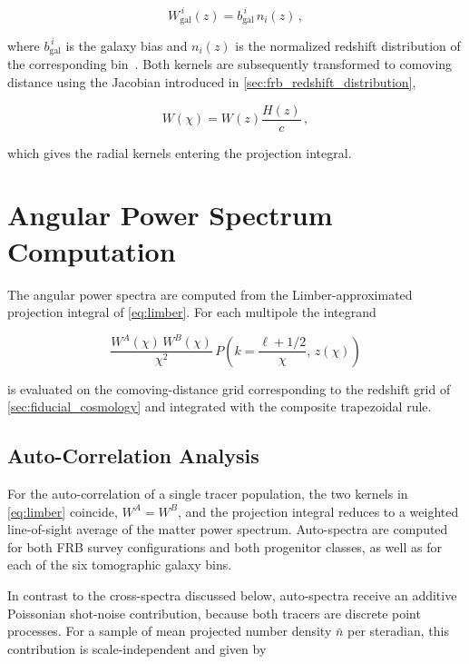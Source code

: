 \begin{equation}\label{eq:weight_galaxy}
    W_{\mathrm{gal}}^{\,i}(z) = b_{\mathrm{gal}}^{\,i} \, n_i(z) \,,
\end{equation}

where $b_{\mathrm{gal}}^{\,i}$ is the galaxy bias and $n_i(z)$ is the normalized redshift
distribution of the corresponding bin~\cite{Muir_2020}.
Both kernels are subsequently transformed to comoving distance using the Jacobian introduced in \autoref{sec:frb_redshift_distribution},

\begin{equation}\label{eq:weight_chi}
    W(\chi) = W(z) \frac{H(z)}{c} \,,
\end{equation}

which gives the radial kernels entering the projection integral.

\section{Angular Power Spectrum Computation} \label{sec:angular_power_spectra}
The angular power spectra are computed from the Limber-approximated projection integral of
\autoref{eq:limber}.
For each multipole the integrand

\begin{equation}
    \frac{W^{A}(\chi)\,W^{B}(\chi)}{\chi^2}\,
    P\!\left(k = \frac{\ell+1/2}{\chi},\, z(\chi)\right)
\end{equation}

is evaluated on the comoving-distance grid corresponding to the redshift grid of
\autoref{sec:fiducial_cosmology} and integrated with the composite trapezoidal rule. 

\subsection{Auto-Correlation Analysis} \label{sec:auto_correlation_analysis}

For the auto-correlation of a single tracer population, the two kernels in \autoref{eq:limber}
coincide, $W^A = W^B$, and the projection integral reduces to a weighted line-of-sight average of
the matter power spectrum. Auto-spectra are computed for both FRB survey configurations and both
progenitor classes, as well as for each of the six tomographic galaxy bins.

In contrast to the cross-spectra discussed below, auto-spectra receive an additive Poissonian
shot-noise contribution, because both tracers are discrete point processes. For a sample of mean
projected number density $\bar{n}$ per steradian, this contribution is scale-independent and given by

